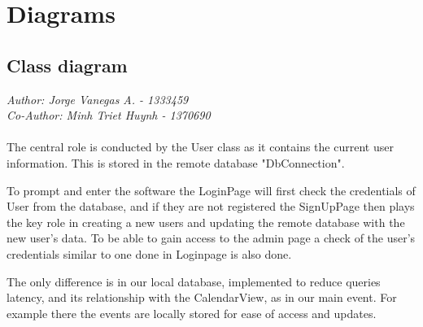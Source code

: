 \chapter{\centering Diagrams}

\section{Class diagram}
\emph{Author: Jorge Vanegas A. - 1333459\\
Co-Author: Minh Triet Huynh - 1370690}\\
\\The central role is conducted by the User class as it contains the current user information. This is stored in the remote database "DbConnection".
\par To prompt and enter the software the LoginPage will first check the credentials of User from the database, and if they are not registered the SignUpPage then plays the key role in creating a new users and updating the remote database with the new user's data. To be able to gain access to the admin page a check
of the user's credentials similar to one done in Loginpage is also done.

\par The only difference is in our local database, implemented to reduce queries latency, and its relationship with the CalendarView, as in our main event. For example there the events are locally stored for ease of access and updates.\\

